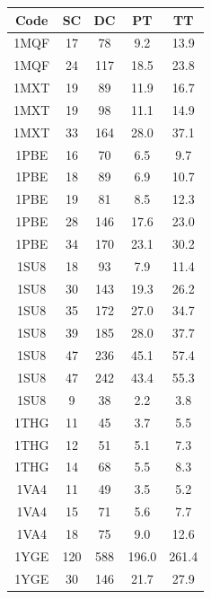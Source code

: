\begin{table}
    \fontsize{9}{11}\selectfont
    \begin{tabular}{||c |c c c c||}
        \hline
        Code & SC & DC & PT & TT \\ [0.5ex]
        \hline\hline
        1MQF & 17 & 78 & 9.2 & 13.9 \\
        \hline
        1MQF & 24 & 117 & 18.5 & 23.8 \\
        \hline
        1MXT & 19 & 89 & 11.9 & 16.7 \\
        \hline
        1MXT & 19 & 98 & 11.1 & 14.9 \\
        \hline
        1MXT & 33 & 164 & 28.0 & 37.1 \\
        \hline
        1PBE & 16 & 70 & 6.5 & 9.7 \\
        \hline
        1PBE & 18 & 89 & 6.9 & 10.7 \\
        \hline
        1PBE & 19 & 81 & 8.5 & 12.3 \\
        \hline
        1PBE & 28 & 146 & 17.6 & 23.0 \\
        \hline
        1PBE & 34 & 170 & 23.1 & 30.2 \\
        \hline
        1SU8 & 18 & 93 & 7.9 & 11.4 \\
        \hline
        1SU8 & 30 & 143 & 19.3 & 26.2 \\
        \hline
        1SU8 & 35 & 172 & 27.0 & 34.7 \\
        \hline
        1SU8 & 39 & 185 & 28.0 & 37.7 \\
        \hline
        1SU8 & 47 & 236 & 45.1 & 57.4 \\
        \hline
        1SU8 & 47 & 242 & 43.4 & 55.3 \\
        \hline
        1SU8 & 9 & 38 & 2.2 & 3.8 \\
        \hline
        1THG & 11 & 45 & 3.7 & 5.5 \\
        \hline
        1THG & 12 & 51 & 5.1 & 7.3 \\
        \hline
        1THG & 14 & 68 & 5.5 & 8.3 \\
        \hline
        1VA4 & 11 & 49 & 3.5 & 5.2 \\
        \hline
        1VA4 & 15 & 71 & 5.6 & 7.7 \\
        \hline
        1VA4 & 18 & 75 & 9.0 & 12.6 \\
        \hline
        1YGE & 120 & 588 & 196.0 & 261.4 \\
        \hline
        1YGE & 30 & 146 & 21.7 & 27.9 \\

\end{tabular}
\end{table}
